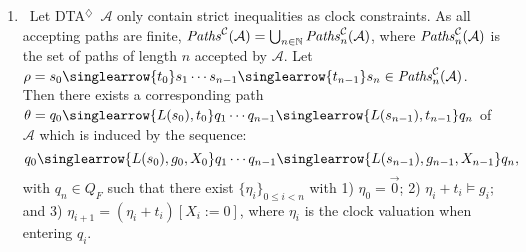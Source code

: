 \documentclass{LMCS}
\newcommand{\mc}[1]{\mathcal{#1}}
\newcommand{\<}{\langle}
\renewcommand{\>}{\rangle}
\newcommand{\mA}{\mathcal{A}}
\newcommand{\DTA}{\textsc{DTA}}
\newcommand{\DTAr}{\DTA$^{\!\Ever}$}
\newcommand{\mv}[1]{\singlearrow{#1}}
\newcommand{\Paths}{{\it Paths}}
\newcommand{\F}{\mathop{\diamondsuit}}
\newcommand{\Nats}{\mathbb{N}}
\newcommand{\Ever}{\F}
\begin{document}
\begin{enumerate}
\item{}\
Let \DTAr\ $\mA$ only contain strict inequalities as clock constraints.
As all accepting paths are finite, $\Paths^{\mc{C}}(\mc{A}) = \bigcup_{n\in \Nats}
\Paths^{\mc{C}}_n(\mc{A})$, where $\Paths^{\mc{C}}_n(\mc{A})$ is the set of paths
of length $n$ accepted by $\mc{A}$.
Let $\rho = s_0 \mv{t_0} s_1\cdots s_{n-1} \mv{t_{n-1}} s_n \in \Paths^{\mc{C}}_n(\mc{A})$.
Then there exists a corresponding path $\theta = q_0 \mv{L(s_0),t_0} q_1 \cdots q_{n-1}
\mv{L(s_{n-1}),t_{n-1}} q_n$ of $\mc{A}$ which is induced by the sequence:
\[
q_0 \mv{L(s_0), g_0, X_0} q_1 \cdots
q_{n-1} \mv{L(s_{n-1}), g_{n-1}, X_{n-1}} q_n,
\]
with $q_n \in Q_F$ such that there exist $\{\eta_i\}_{0\leqslant i< n}$
with 1) $\eta_0 = \vec{0}$; 2) $\eta_i{+}t_i \models g_{i}$; and 3) $\eta_{i+1} = (\eta_i{+}t_i)[X_i:=0]$, where $\eta_i$ is the clock valuation when entering $q_i$.


\end{enumerate}
\end{document}
